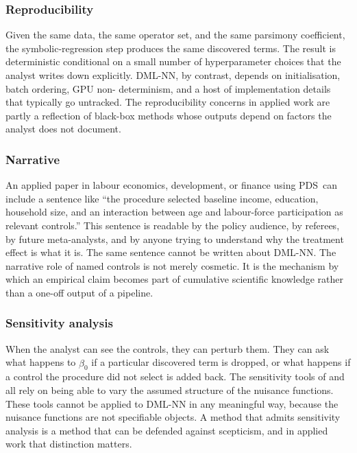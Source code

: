 \documentclass[11pt, a4paper]{article}
\theoremstyle{plain}
\theoremstyle{definition}
\theoremstyle{remark}
\newcommand{\pds}{\textsc{PDS}}
\newcommand{\dml}{\textsc{DML}}
\newcommand{\betahat}{\hat{\beta}_0}
\begin{document}
\subsubsection{Reproducibility}

Given the same data, the same operator
set, and the same parsimony coefficient, the symbolic-regression
step produces the same discovered terms. The result is
deterministic conditional on a small number of hyperparameter
choices that the analyst writes down explicitly. \dml-NN, by
contrast, depends on initialisation, batch ordering, GPU non-%
determinism, and a host of implementation details that typically
go untracked. The reproducibility concerns in applied work are
partly a reflection of black-box methods whose outputs depend on
factors the analyst does not document.

\subsubsection{Narrative}

An applied paper in labour economics,
development, or finance using \pds\ can include a sentence like
``the procedure selected baseline income, education, household
size, and an interaction between age and labour-force
participation as relevant controls.'' This sentence is readable
by the policy audience, by referees, by future meta-analysts,
and by anyone trying to understand why the treatment effect is
what it is. The same sentence cannot be written about \dml-NN.
The narrative role of named controls is not merely cosmetic. It
is the mechanism by which an empirical claim becomes part of
cumulative scientific knowledge rather than a one-off output of
a pipeline.

\subsubsection{Sensitivity analysis}

When the analyst can see the
controls, they can perturb them. They can ask what happens to
$\betahat$ if a particular discovered term is dropped, or what
happens if a control the procedure did not select is added back.
The sensitivity tools of \citet{cinelli2020sensitivity} and
\citet{conley2012plausibly} all rely on being able to vary the
assumed structure of the nuisance functions. These tools cannot
be applied to \dml-NN in any meaningful way, because the
nuisance functions are not specifiable objects. A method that
admits sensitivity analysis is a method that can be defended
against scepticism, and in applied work that distinction
matters.
\end{document}
